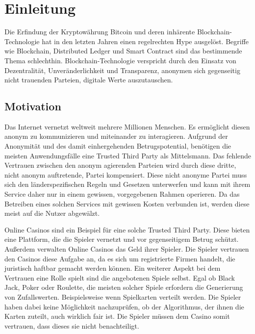\chapter{Einleitung} %
\label{Chapter1}
\newcommand{\keyword}[1]{\textbf{#1}}
\newcommand{\tabhead}[1]{\textbf{#1}}
\newcommand{\code}[1]{\texttt{#1}}
\newcommand{\file}[1]{\texttt{\bfseries#1}}
\newcommand{\option}[1]{\texttt{\itshape#1}}
Die Erfindung der Kryptowährung Bitcoin und deren inhärente Blockchain-Technologie hat in den letzten Jahren einen regelrechten Hype ausgelöst. Begriffe wie Blockchain, Distributed Ledger und Smart Contract sind das bestimmende Thema schlechthin. 
Blockchain-Technologie verspricht durch den Einsatz von Dezentralität, Unveränderlichkeit und Transparenz, anonymen sich gegenseitig nicht trauenden Parteien, digitale Werte auszutauschen.

\section{Motivation}
Das Internet vernetzt weltweit mehrere Millionen Menschen. Es ermöglicht diesen anonym zu kommunizieren und miteinander zu interagieren. Aufgrund der Anonymität und des damit einhergehenden Betrugspotential, benötigen die meisten Anwendungsfälle eine Trusted Third Party als Mittelsmann. Das fehlende Vertrauen zwischen den anonym agierenden Parteien wird durch diese dritte, nicht anonym auftretende, Partei kompensiert. Diese nicht anonyme Partei muss sich den länderspezifischen Regeln und Gesetzen unterwerfen und kann mit ihrem Service daher nur in einem gewissen, vorgegebenen Rahmen operieren. Da das Betreiben eines solchen Services mit gewissen Kosten verbunden ist, werden diese meist auf die Nutzer abgewälzt. 

Online Casinos sind ein Beispiel für eine solche Trusted Third Party. Diese bieten eine Plattform, die die Spieler vernetzt und vor gegenseitigem Betrug schützt. Außerdem verwalten Online Casinos das Geld ihrer Spieler. Die Spieler vertrauen den Casinos diese Aufgabe an, da es sich um registrierte Firmen handelt, die juristisch haftbar gemacht werden können. Ein weiterer Aspekt bei dem Vertrauen eine Rolle spielt sind die angebotenen Spiele selbst. Egal ob Black Jack, Poker oder Roulette, die meisten solcher Spiele erfordern die Generierung von Zufallswerten. Beispielsweise wenn Spielkarten verteilt werden. Die Spieler haben dabei keine Möglichkeit nachzuprüfen, ob der Algorithmus, der ihnen die Karten zuteilt, auch wirklich fair ist. Die Spieler müssen dem Casino somit vertrauen, dass dieses sie nicht benachteiligt. 

